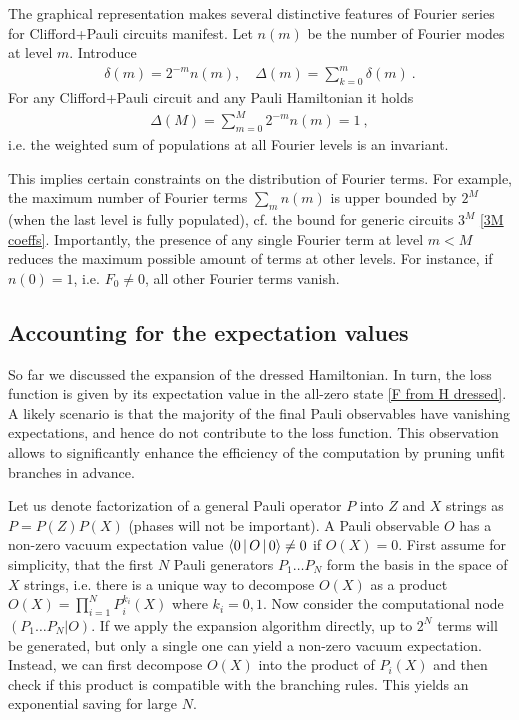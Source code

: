 \documentclass[twocolumn, amsfonts, amssymb, aps, nofootinbib]{revtex4-2}
\newcommand{\CP}{Clifford+Pauli}
\begin{document}
The graphical representation makes several distinctive features of Fourier series for \CP{} circuits manifest. Let $n(m)$ be the number of Fourier modes at level $m$. Introduce
\begin{align}
	\delta(m)=2^{-m}n(m),\quad \Delta(m)=\sum_{k=0}^m \delta(m) \label{delta def} \ .
\end{align}
For any \CP{} circuit and any Pauli Hamiltonian it holds
\begin{align}
\Delta(M)=\sum_{m=0}^M 2^{-m}n(m)=1 \ , \label{invariant}
\end{align}
i.e. the weighted sum of populations at all Fourier levels is an invariant. 

This implies certain constraints on the distribution of Fourier terms. For example, the maximum number of Fourier terms $\sum_m n(m)$ is upper bounded by $2^M$ (when the last level is fully populated), cf. the bound for generic circuits $3^M$ \eqref{3M coeffs}. Importantly, the presence of any single Fourier term at level $m<M$ reduces the maximum possible amount of terms at other levels. For instance, if $n(0)=1$, i.e. $F_0\neq0$, all other Fourier terms vanish. 
\subsection{Accounting for the expectation values} \label{sec pruning}
So far we discussed the expansion of the dressed Hamiltonian. In turn, the loss function  is given by its expectation value in the all-zero state \eqref{F from H dressed}. A likely scenario is that the majority of the final Pauli observables have vanishing expectations, and hence do not contribute to the loss function. This observation allows to significantly enhance the efficiency of the computation by pruning unfit branches in advance.

Let us denote factorization of a general Pauli operator $P$ into $Z$ and $X$ strings as $P=P(Z)P(X)$ (phases will not be important). A Pauli observable $O$ has a non-zero vacuum expectation value $\Braket{0|O|0}\neq0$ if $O(X)=0$. 
First assume for simplicity, that the first $N$ Pauli generators $P_1\dots P_N$ form the basis in the space of $X$ strings, i.e. there is a unique way to decompose $O(X)$ as a product $O(X)=\prod_{i=1}^N P^{k_i}_i(X)$ where $k_i=0,1$. Now consider the computational node $(P_1\dots P_N|O)$. If we apply the expansion algorithm directly, up to $2^N$ terms will be generated, but only a single one can yield a non-zero vacuum expectation. Instead, we can first decompose $O(X)$ into the product of $P_i(X)$ and then check if this product is compatible with the branching rules. This yields an exponential saving for large $N$.
\end{document}
